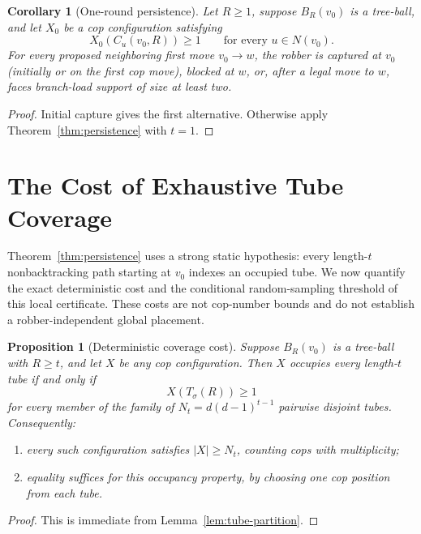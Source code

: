 \documentclass[11pt]{amsart}
\newtheorem{proposition}[theorem]{Proposition}
\newtheorem{corollary}[theorem]{Corollary}
\theoremstyle{definition}
\begin{document}
\begin{corollary}[One-round persistence]
\label{cor:one-round}
Let $R\geq1$, suppose $B_R(v_0)$ is a tree-ball, and let $X_0$ be a cop configuration satisfying
\[
X_0(C_u(v_0,R))\geq1
\qquad\text{for every }u\in N(v_0).
\]
For every proposed neighboring first move $v_0\to w$, the robber is captured at $v_0$ (initially or on the first cop move), blocked at $w$, or, after a legal move to $w$, faces branch-load support of size at least two.
\end{corollary}

\begin{proof}
Initial capture gives the first alternative. Otherwise apply Theorem~\ref{thm:persistence} with $t=1$.
\end{proof}


\section{The Cost of Exhaustive Tube Coverage}

Theorem~\ref{thm:persistence} uses a strong static hypothesis: every length-$t$ nonbacktracking path starting at $v_0$ indexes an occupied tube. We now quantify the exact deterministic cost and the conditional random-sampling threshold of this local certificate. These costs are not cop-number bounds and do not establish a robber-independent global placement.

\begin{proposition}[Deterministic coverage cost]
\label{prop:deterministic-cost}
Suppose $B_R(v_0)$ is a tree-ball with $R\geq t$, and let $X$ be any cop configuration. Then $X$ occupies every length-$t$ tube if and only if
\[
X(T_\sigma(R))\geq1
\]
for every member of the family of $N_t=d(d-1)^{t-1}$ pairwise disjoint tubes. Consequently:
\begin{enumerate}[label=(\roman*)]
\item every such configuration satisfies $|X|\geq N_t$, counting cops with multiplicity;
\item equality suffices for this occupancy property, by choosing one cop position from each tube.
\end{enumerate}
\end{proposition}

\begin{proof}
This is immediate from Lemma~\ref{lem:tube-partition}.
\end{proof}
\end{document}
